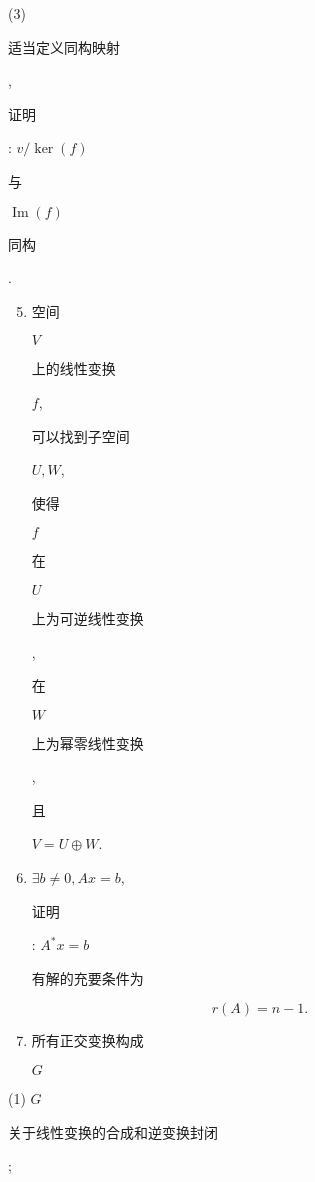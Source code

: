\documentclass[10pt]{article}
\begin{document}
(3) \begin{CJK}{UTF8}{mj}适当定义同构映射\end{CJK}, \begin{CJK}{UTF8}{mj}证明\end{CJK}: $v / \operatorname{ker}(f)$ \begin{CJK}{UTF8}{mj}与\end{CJK} $\operatorname{Im}(f)$ \begin{CJK}{UTF8}{mj}同构\end{CJK}.

\begin{enumerate}
  \setcounter{enumi}{4}
  \item \begin{CJK}{UTF8}{mj}空间\end{CJK} $V$ \begin{CJK}{UTF8}{mj}上的线性变换\end{CJK} $f$, \begin{CJK}{UTF8}{mj}可以找到子空间\end{CJK} $U, W$, \begin{CJK}{UTF8}{mj}使得\end{CJK} $f$ \begin{CJK}{UTF8}{mj}在\end{CJK} $U$ \begin{CJK}{UTF8}{mj}上为可逆线性变换\end{CJK}, \begin{CJK}{UTF8}{mj}在\end{CJK} $W$ \begin{CJK}{UTF8}{mj}上为幂零线性变换\end{CJK}, \begin{CJK}{UTF8}{mj}且\end{CJK} $V=U \oplus W$.

  \item $\exists b \neq 0, A x=b$, \begin{CJK}{UTF8}{mj}证明\end{CJK}: $A^{*} x=b$ \begin{CJK}{UTF8}{mj}有解的充要条件为\end{CJK}

\end{enumerate}
$$
r(A)=n-1 .
$$

\begin{enumerate}
  \setcounter{enumi}{6}
  \item \begin{CJK}{UTF8}{mj}所有正交变换构成\end{CJK} $G$
\end{enumerate}
(1) $G$ \begin{CJK}{UTF8}{mj}关于线性变换的合成和逆变换封闭\end{CJK};
\end{document}
